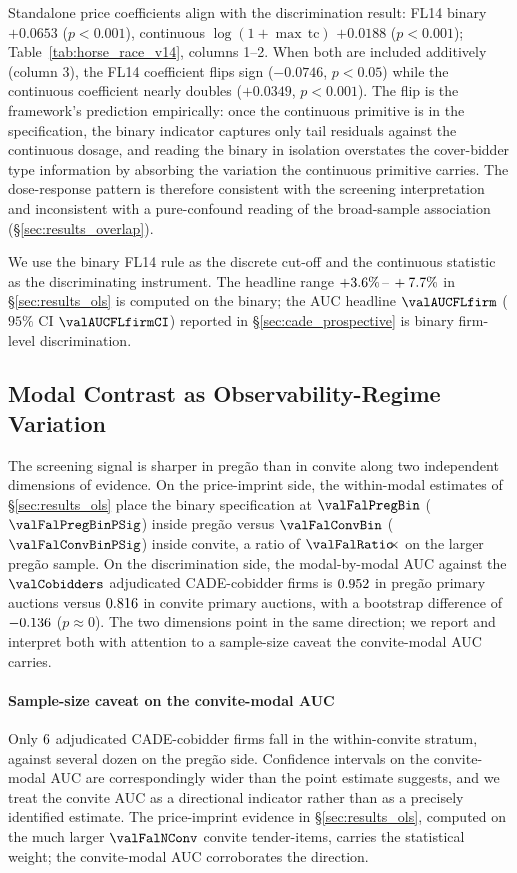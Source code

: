 Standalone price coefficients align with the discrimination
result: FL14 binary $+0.0653$ ($p<0.001$), continuous
$\log(1+\max\,\text{tc})$ $+0.0188$ ($p<0.001$);
Table~\ref{tab:horse_race_v14}, columns 1--2. When both are
included additively (column 3), the FL14 coefficient flips
sign ($-0.0746$, $p<0.05$) while the continuous coefficient
nearly doubles ($+0.0349$, $p<0.001$). The flip is the
framework's prediction empirically: once the continuous
primitive is in the specification, the binary indicator
captures only tail residuals against the continuous dosage,
and reading the binary in isolation overstates the cover-bidder
type information by absorbing the variation the continuous
primitive carries. The dose-response pattern is therefore
consistent with the screening interpretation and inconsistent
with a pure-confound reading of the broad-sample association
(\S\ref{sec:results_overlap}).

We use the binary FL14 rule as the discrete cut-off and the
continuous statistic as the discriminating instrument. The
headline range $+3.6\%\,\text{--}\,+7.7\%$ in §\ref{sec:results_ols} is
computed on the binary; the AUC headline $\valAUCFLfirm$
($95\%$ CI $\valAUCFLfirmCI$) reported in
§\ref{sec:cade_prospective} is binary firm-level discrimination.

\subsection{Modal Contrast as Observability-Regime Variation}
\label{sec:mech_modal}

The screening signal is sharper in preg\~ao than in convite
along two independent dimensions of evidence. On the
price-imprint side, the within-modal estimates of
\S\ref{sec:results_ols} place the binary specification at
$\valFalPregBin$ ($\valFalPregBinPSig$) inside preg\~ao versus
$\valFalConvBin$ ($\valFalConvBinPSig$) inside convite, a ratio
of $\valFalRatio\!\!\times$ on the larger preg\~ao sample. On
the discrimination side, the modal-by-modal AUC against the
$\valCobidders$ adjudicated CADE-cobidder firms is
$0.952$ in preg\~ao primary auctions versus
$0.816$ in convite primary auctions, with a bootstrap
difference of $-0.136$ ($p\approx 0$). The two
dimensions point in the same direction; we report and interpret
both with attention to a sample-size caveat the convite-modal
AUC carries.

\paragraph{Sample-size caveat on the convite-modal AUC} Only
$6$ adjudicated CADE-cobidder firms fall in
the within-convite stratum, against several dozen on the
preg\~ao side. Confidence intervals on the convite-modal AUC
are correspondingly wider than the point estimate suggests, and
we treat the convite AUC as a directional indicator rather than
as a precisely identified estimate. The price-imprint evidence
in \S\ref{sec:results_ols}, computed on the much larger
$\valFalNConv$ convite tender-items, carries the statistical
weight; the convite-modal AUC corroborates the direction.

